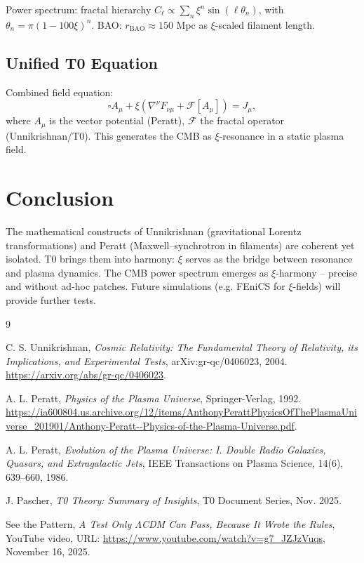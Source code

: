 	Power spectrum: fractal hierarchy $C_\ell \propto \sum_n \xi^n \sin(\ell \theta_n)$, with $\theta_n = \pi (1 - 100 \xi)^n$. BAO: $r_{\text{BAO}} \approx 150$ Mpc as $\xi$-scaled filament length.
	
	\subsection{Unified T0 Equation}
	Combined field equation:
	\begin{equation}
		\square A_\mu + \xi \left( \nabla^\nu F_{\nu\mu} + \mathcal{F}[A_\mu] \right) = J_\mu,
	\end{equation}
	where $A_\mu$ is the vector potential (Peratt), $\mathcal{F}$ the fractal operator (Unnikrishnan/T0). This generates the CMB as $\xi$-resonance in a static plasma field.
	
	\section{Conclusion}
	The mathematical constructs of Unnikrishnan (gravitational Lorentz transformations) and Peratt (Maxwell–synchrotron in filaments) are coherent yet isolated. T0 brings them into harmony: $\xi$ serves as the bridge between resonance and plasma dynamics. The CMB power spectrum emerges as $\xi$-harmony -- precise and without ad-hoc patches. Future simulations (e.g. FEniCS for $\xi$-fields) will provide further tests.
	
	\begin{thebibliography}{9}
		
		C. S. Unnikrishnan, \textit{Cosmic Relativity: The Fundamental Theory of Relativity, its Implications, and Experimental Tests},
		arXiv:gr-qc/0406023, 2004.
		\url{https://arxiv.org/abs/gr-qc/0406023}.
		
		A. L. Peratt, \textit{Physics of the Plasma Universe},
		Springer-Verlag, 1992.
		\url{https://ia600804.us.archive.org/12/items/AnthonyPerattPhysicsOfThePlasmaUniverse_201901/Anthony-Peratt--Physics-of-the-Plasma-Universe.pdf}.
		
		A. L. Peratt, \textit{Evolution of the Plasma Universe: I. Double Radio Galaxies, Quasars, and Extragalactic Jets},
		IEEE Transactions on Plasma Science, 14(6), 639--660, 1986.
		
		J. Pascher, \textit{T0 Theory: Summary of Insights},
		T0 Document Series, Nov. 2025.
		
		See the Pattern, \textit{A Test Only $\Lambda$CDM Can Pass, Because It Wrote the Rules},
		YouTube video, URL: \url{https://www.youtube.com/watch?v=g7_JZJzVuqs},
		November 16, 2025.
		
	\end{thebibliography}
